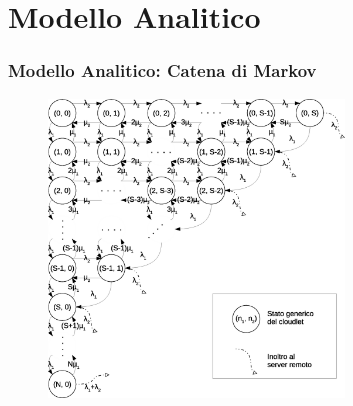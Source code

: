 \section{Modello Analitico}
\begin{frame}
\frametitle{Modello Analitico: Catena di Markov}

\begin{figure}[!h]
\centering
\includegraphics[width=0.7\textwidth]{../figures/ctmc}
\label{ctmc}
\end{figure}

\end{frame}
